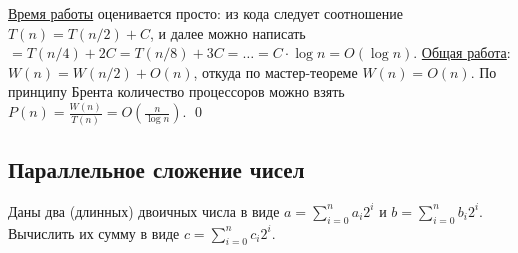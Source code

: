\underline{Время работы} оценивается просто: из кода следует соотношение $T(n) = T(n/2) + C$, и далее можно написать $= T(n/4) + 2C = T(n/8) + 3C = \ldots = C\cdot\log n = O(\log n)$. \underline{Общая работа}: $W(n) = W(n/2) + O(n)$, откуда по мастер-теореме $W(n) = O(n)$. По принципу Брента количество процессоров можно взять $P(n) = \frac{W(n)}{T(n)} = O\left(\frac{n}{\log n}\right)$. \qed

\subsection{Параллельное сложение чисел}
\begin{problem*}Даны два (длинных) двоичных числа в виде $a = \sum_{i=0}^n a_i2^i$ и $b = \sum_{i=0}^n b_i2^i$. Вычислить их сумму в виде $c = \sum_{i=0}^n c_i2^i$.
\end{problem*}

